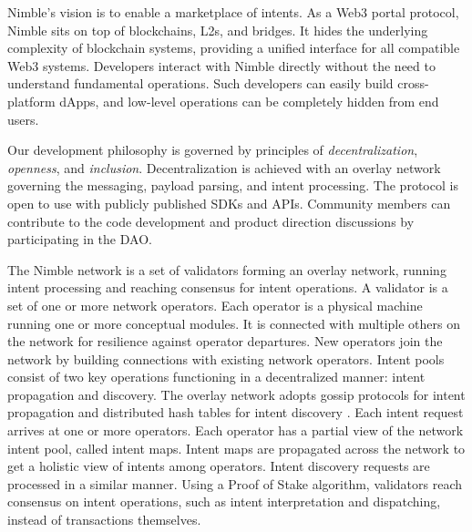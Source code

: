 \documentclass[11pt,letterpaper,twocolumn]{article}
\begin{document}
Nimble’s vision is to enable a marketplace of intents.
As a Web3 portal protocol, Nimble sits on top of blockchains, L2s, and bridges. It hides the underlying complexity of blockchain systems, providing a unified interface for all compatible Web3 systems. Developers interact with Nimble directly without the need to understand fundamental operations. Such developers can easily build cross-platform dApps, and low-level operations can be completely hidden from end users.

Our development philosophy is governed by principles of \emph{decentralization}, \emph{openness}, and \emph{inclusion}. Decentralization is achieved with an overlay network governing the messaging, payload parsing, and
intent processing. The protocol is open to use with publicly published SDKs and APIs. Community members can contribute to the code development and product direction discussions by participating in the DAO.

The Nimble network is a set of validators forming an overlay network, 
running intent processing and reaching consensus for intent operations. A validator is a set of one or more network operators.
Each operator is a physical machine running one or more conceptual modules.
It is connected with multiple others on the network for resilience against
operator departures. New operators join the network by building connections with existing
network operators.
Intent pools consist of two key operations functioning in a decentralized manner:
intent propagation and discovery.
The overlay network adopts gossip protocols for intent propagation
and distributed hash tables for intent discovery \cite{kaashoek2003koorde, jin2011network}. Each intent request arrives at one or more operators.
Each operator has a partial view of the network intent pool, called intent maps.
Intent maps are propagated across the network to get a holistic view of intents among operators. Intent discovery requests are processed in a similar manner.
Using a Proof of Stake algorithm, validators reach consensus on intent operations, such as intent interpretation and dispatching, instead of transactions themselves.
\end{document}
